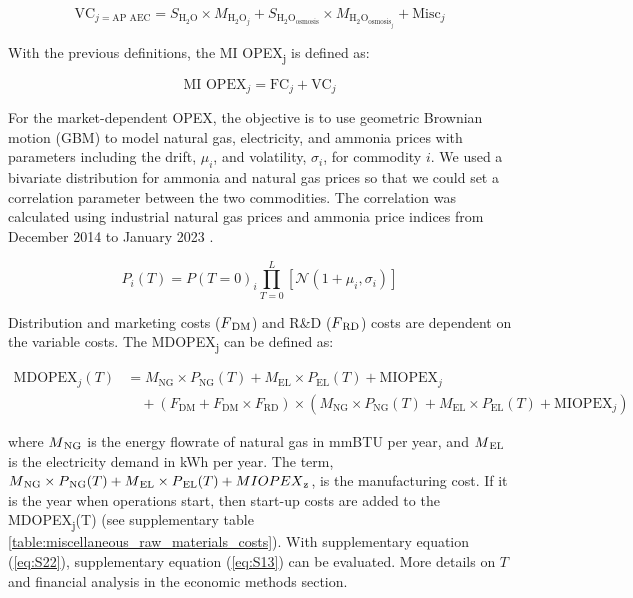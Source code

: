 \documentclass{article}
\begin{document}
\begin{equation}
\text{VC}_{j=\text{AP AEC}} = S_{\text{H}_2\text{O}} \times M_{\text{H}_2\text{O}_j} + S_{\text{H}_2\text{O}_{\text{osmosis}}} \times M_{\text{H}_2\text{O}_{\text{osmosis}_j}} + \text{Misc}_j
\label{eq:S19}
\end{equation}

With the previous definitions, the MI OPEX\textsubscript{j} is defined as:

\begin{equation}
\text{MI OPEX}_j = \text{FC}_j + \text{VC}_j
\label{eq:S20}
\end{equation}

For the market-dependent OPEX, the objective is to use geometric Brownian motion (GBM) to model natural gas, electricity, and ammonia prices with parameters including the drift, \( \mu_i \), and volatility, \( \sigma_i \), for commodity \( i \). We used a bivariate distribution for ammonia and natural gas prices so that we could set a correlation parameter between the two commodities. The correlation was calculated using industrial natural gas prices and ammonia price indices from December 2014 to January 2023 \cite{EIA2023b}.

\begin{equation}
P_i (T) = P(T=0)_i \prod_{T=0}^L \left[ \mathcal{N}(1+\mu_i, \sigma_i) \right]
\label{eq:S21}
\end{equation}

Distribution and marketing costs (\( F\textsubscript{DM} \)) and R\&D (\( F\textsubscript{RD} \)) costs are dependent on the variable costs. The MDOPEX\textsubscript{j} can be defined as:

\begin{equation}
\begin{aligned}
\text{MDOPEX}_j (T) &= M_{\text{NG}} \times P_{\text{NG}} (T) + M_{\text{EL}} \times P_{\text{EL}} (T) + \text{MIOPEX}_j \\
&\quad + \left(F_{\text{DM}} + F_{\text{DM}} \times F_{\text{RD}} \right) \times \left( M_{\text{NG}} \times P_{\text{NG}} (T) + M_{\text{EL}} \times P_{\text{EL}} (T) + \text{MIOPEX}_j \right)
\end{aligned}
\label{eq:S22}
\end{equation}

where \( M\textsubscript{NG} \) is the energy flowrate of natural gas in mmBTU per year, and \( M\textsubscript{EL} \) is the electricity demand in kWh per year. The term, \( M\textsubscript{NG} \times P\textsubscript{NG}(T) + M\textsubscript{EL} \times P\textsubscript{EL}(T) + MIOPEX\textsubscript{z} \), is the manufacturing cost. If it is the year when operations start, then start-up costs are added to the MDOPEX\textsubscript{j}(T) (see supplementary table \ref{table:miscellaneous_raw_materials_costs}). With supplementary equation (\ref{eq:S22}), supplementary equation (\ref{eq:S13}) can be evaluated. More details on \( T \) and financial analysis in the economic methods section.
\end{document}
